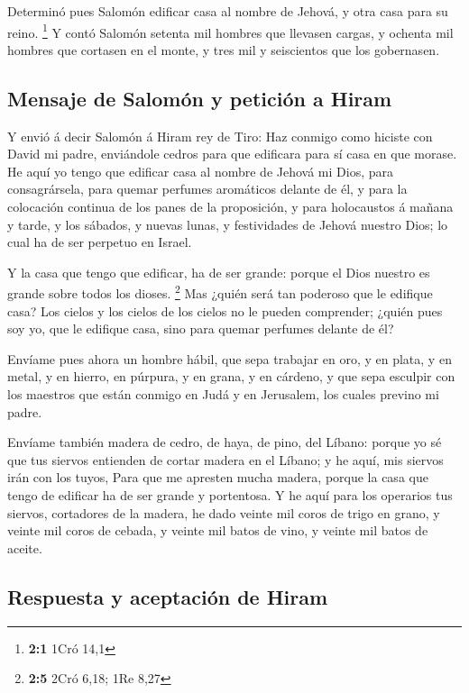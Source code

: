  Determinó pues Salomón edificar casa al nombre de Jehová,
y otra casa para su reino. \footnote{\textbf{2:1} 1Cró 14,1}
 Y contó Salomón setenta mil hombres que llevasen cargas,
y ochenta mil hombres que cortasen en el monte, y tres mil y seiscientos
que los gobernasen.

\hypertarget{mensaje-de-salomuxf3n-y-peticiuxf3n-a-hiram}{%
\subsection{Mensaje de Salomón y petición a
Hiram}\label{mensaje-de-salomuxf3n-y-peticiuxf3n-a-hiram}}

 Y envió á decir Salomón á Hiram rey de Tiro: Haz conmigo
como hiciste con David mi padre, enviándole cedros para que edificara
para sí casa en que morase.  He aquí yo tengo que edificar
casa al nombre de Jehová mi Dios, para consagrársela, para quemar
perfumes aromáticos delante de él, y para la colocación continua de los
panes de la proposición, y para holocaustos á mañana y tarde, y los
sábados, y nuevas lunas, y festividades de Jehová nuestro Dios; lo cual
ha de ser perpetuo en Israel.

 Y la casa que tengo que edificar, ha de ser grande:
porque el Dios nuestro es grande sobre todos los dioses. \footnote{\textbf{2:5}
  2Cró 6,18; 1Re 8,27}  Mas ¿quién será tan poderoso que
le edifique casa? Los cielos y los cielos de los cielos no le pueden
comprender; ¿quién pues soy yo, que le edifique casa, sino para quemar
perfumes delante de él?

 Envíame pues ahora un hombre hábil, que sepa trabajar en
oro, y en plata, y en metal, y en hierro, en púrpura, y en grana, y en
cárdeno, y que sepa esculpir con los maestros que están conmigo en Judá
y en Jerusalem, los cuales previno mi padre.

 Envíame también madera de cedro, de haya, de pino, del
Líbano: porque yo sé que tus siervos entienden de cortar madera en el
Líbano; y he aquí, mis siervos irán con los tuyos,  Para
que me apresten mucha madera, porque la casa que tengo de edificar ha de
ser grande y portentosa.  Y he aquí para los operarios
tus siervos, cortadores de la madera, he dado veinte mil coros de trigo
en grano, y veinte mil coros de cebada, y veinte mil batos de vino, y
veinte mil batos de aceite.

\hypertarget{respuesta-y-aceptaciuxf3n-de-hiram}{%
\subsection{Respuesta y aceptación de
Hiram}\label{respuesta-y-aceptaciuxf3n-de-hiram}}

